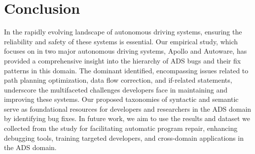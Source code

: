 \section{Conclusion}\label{sec:conclusion}

In the rapidly evolving landscape of autonomous driving systems, ensuring the reliability and safety of these systems is essential. Our empirical study, which focuses on \bfps in two major autonomous driving systems, Apollo and Autoware, has provided a comprehensive insight into the hierarchy of ADS bugs and their fix patterns in this domain. 
The dominant \bfps identified, encompassing issues related to path planning optimization, data flow correction, and if-related statements, underscore the multifaceted challenges developers face in maintaining and improving these systems.
Our proposed taxonomies of \numsyn syntactic and \numsem semantic \bfps 
serve as foundational resources for developers and researchers in the ADS domain by identifying  \numbug bug fixes. 
In future work, we aim to use the results and dataset we collected from the \bfp study for facilitating automatic program repair, enhancing debugging tools, training targeted developers, and cross-domain applications in the ADS domain. 

